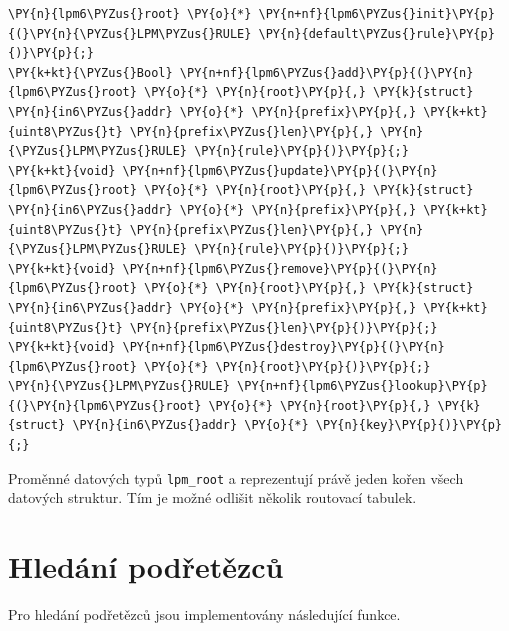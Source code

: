 \begin{Verbatim}[commandchars=\\\{\}]
\PY{n}{lpm6\PYZus{}root} \PY{o}{*} \PY{n+nf}{lpm6\PYZus{}init}\PY{p}{(}\PY{n}{\PYZus{}LPM\PYZus{}RULE} \PY{n}{default\PYZus{}rule}\PY{p}{)}\PY{p}{;}
\PY{k+kt}{\PYZus{}Bool} \PY{n+nf}{lpm6\PYZus{}add}\PY{p}{(}\PY{n}{lpm6\PYZus{}root} \PY{o}{*} \PY{n}{root}\PY{p}{,} \PY{k}{struct} \PY{n}{in6\PYZus{}addr} \PY{o}{*} \PY{n}{prefix}\PY{p}{,} \PY{k+kt}{uint8\PYZus{}t} \PY{n}{prefix\PYZus{}len}\PY{p}{,} \PY{n}{\PYZus{}LPM\PYZus{}RULE} \PY{n}{rule}\PY{p}{)}\PY{p}{;}
\PY{k+kt}{void} \PY{n+nf}{lpm6\PYZus{}update}\PY{p}{(}\PY{n}{lpm6\PYZus{}root} \PY{o}{*} \PY{n}{root}\PY{p}{,} \PY{k}{struct} \PY{n}{in6\PYZus{}addr} \PY{o}{*} \PY{n}{prefix}\PY{p}{,} \PY{k+kt}{uint8\PYZus{}t} \PY{n}{prefix\PYZus{}len}\PY{p}{,} \PY{n}{\PYZus{}LPM\PYZus{}RULE} \PY{n}{rule}\PY{p}{)}\PY{p}{;}
\PY{k+kt}{void} \PY{n+nf}{lpm6\PYZus{}remove}\PY{p}{(}\PY{n}{lpm6\PYZus{}root} \PY{o}{*} \PY{n}{root}\PY{p}{,} \PY{k}{struct} \PY{n}{in6\PYZus{}addr} \PY{o}{*} \PY{n}{prefix}\PY{p}{,} \PY{k+kt}{uint8\PYZus{}t} \PY{n}{prefix\PYZus{}len}\PY{p}{)}\PY{p}{;}
\PY{k+kt}{void} \PY{n+nf}{lpm6\PYZus{}destroy}\PY{p}{(}\PY{n}{lpm6\PYZus{}root} \PY{o}{*} \PY{n}{root}\PY{p}{)}\PY{p}{;}
\PY{n}{\PYZus{}LPM\PYZus{}RULE} \PY{n+nf}{lpm6\PYZus{}lookup}\PY{p}{(}\PY{n}{lpm6\PYZus{}root} \PY{o}{*} \PY{n}{root}\PY{p}{,} \PY{k}{struct} \PY{n}{in6\PYZus{}addr} \PY{o}{*} \PY{n}{key}\PY{p}{)}\PY{p}{;}
\end{Verbatim}

Proměnné datových typů \texttt{lpm\_root} a  reprezentují právě jeden kořen
všech datových struktur. Tím je možné odlišit několik routovací tabulek.


\section{Hledání podřetězců}
Pro hledání podřetězců jsou implementovány následující funkce.

